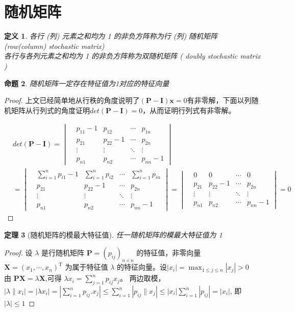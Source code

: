 \documentclass[10t, a4paper, oneside]{ctexbook}
\newtheorem{theorem}{定理}[section]
\newtheorem{definition}[theorem]{定义}
\newtheorem{proposition}[theorem]{命题}
\begin{document}
\section{随机矩阵}
\begin{definition}
\noindent 各行 (列) 元素之和均为 1 的非负方阵称为行 (列) 随机矩阵 (row(column) stochastic matrix)\\
各行与各列元素之和均为 1 的非负方阵称为双随机矩阵 ( doubly stochastic matrix )
\end{definition}
\begin{proposition}
    随机矩阵一定存在特征值为1对应的特征向量  
\end{proposition}
\begin{proof}
    上文已经简单地从行秩的角度说明了$(\mathbf{P}-\mathbf{I})\mathbf{x} = 0$有非零解，下面以列随机矩阵从行列式的角度证明$det({\mathbf{P}-\mathbf{I}}
    ) = 0$，从而证明行列式有非零解。

    $$\begin{aligned}
        &det({\mathbf{P}-\mathbf{I}}) = 
        \begin{vmatrix}
            &p_{11}-1 & p_{12} &\cdots& p_{1n}\\
            &p_{21} &p_{22}-1&\cdots&p_{2n}\\
            &\vdots&\vdots&\ddots&\vdots\\
            &p_{n1}&p_{n2}&\cdots&p_{nn}-1
        \end{vmatrix}\\
        &=\begin{vmatrix}
            &\sum_{i=1}^np_{i1}-1 & \sum_{i=1}^np_{i2} &\cdots& \sum_{i=1}^np_{in}\\
            &p_{21} &p_{22}-1&\cdots&p_{2n}\\
            &\vdots&\vdots&\ddots&\vdots\\
            &p_{n1}&p_{n2}&\cdots&p_{nn}-1
        \end{vmatrix}
        =\begin{vmatrix}
            &0& 0 &\cdots& 0\\
            &p_{21} &p_{22}-1&\cdots&p_{2n}\\
            &\vdots&\vdots&\ddots&\vdots\\
            &p_{n1}&p_{n2}&\cdots&p_{nn}-1
        \end{vmatrix} = 0
    \end{aligned}$$
\end{proof}

\begin{theorem}[随机矩阵的模最大特征值]
    任一随机矩阵的模最大特征值为 1   
\end{theorem}
\begin{proof}
    设 $\lambda$ 是行随机矩阵 $\mathbf{P}=(p_{ij})_{n\times n}$ 的特征值，非零向量 $\mathbf{X} = ( x_1, \cdots , x_n) ^{\mathrm{T} }$ 为属于特征值 $\lambda$ 的特征向量。设$|x_i|=\max_{1\leq j\leq n}|x_j|>0$\\
    由 $\mathbf{PX}=\lambda\mathbf{X}$,可得 $\lambda x_i=\sum_{j=1}^np_{ij}x_j$。 两边取模，$|\lambda\|x_i|=|\lambda x_i|=\left|\sum_{i=1}^np_{ij}.x_j\right|\leq\sum_{i=1}^n|p_{ij}\|x_j|\leq|x_i|\sum_{i=1}^n|p_{ij}|=|x_i|$, 即$|\lambda|\leq1$
\end{proof}
\end{document}

